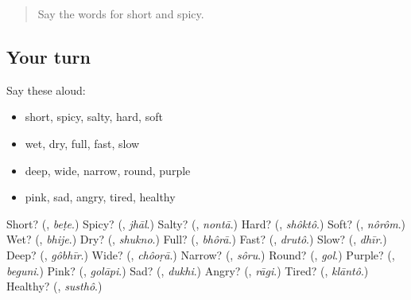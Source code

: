 \label{lesson:BN-R137-second-pass-the-town-and-describing-words}



\begin{quote}
Say the words for short and spicy.
\end{quote}

\subsection*{Your turn}
Say these aloud:

\begin{itemize}
\raggedright
  \item short, spicy, salty, hard, soft
  \item wet, dry, full, fast, slow
  \item deep, wide, narrow, round, purple
  \item pink, sad, angry, tired, healthy
\end{itemize}

\begin{tcolorbox}[breakable,colback=teal!4,colframe=teal!35!black,title={Before you move on}]
Short? (\textbf{}, \emph{beṭe}.) Spicy? (\textbf{}, \emph{jhāl}.) Salty? (\textbf{}, \emph{nontā}.) Hard? (\textbf{}, \emph{shôktô}.) Soft? (\textbf{}, \emph{nôrôm}.) Wet? (\textbf{}, \emph{bhije}.) Dry? (\textbf{}, \emph{shukno}.) Full? (\textbf{}, \emph{bhôrā}.) Fast? (\textbf{}, \emph{drutô}.) Slow? (\textbf{}, \emph{dhīr}.) Deep? (\textbf{}, \emph{gôbhīr}.) Wide? (\textbf{}, \emph{chôoṛā}.) Narrow? (\textbf{}, \emph{sôru}.) Round? (\textbf{}, \emph{gol}.) Purple? (\textbf{}, \emph{beguni}.) Pink? (\textbf{}, \emph{golāpi}.) Sad? (\textbf{}, \emph{dukhi}.) Angry? (\textbf{}, \emph{rāgi}.) Tired? (\textbf{}, \emph{klāntô}.) Healthy? (\textbf{}, \emph{susthô}.)
\end{tcolorbox}
